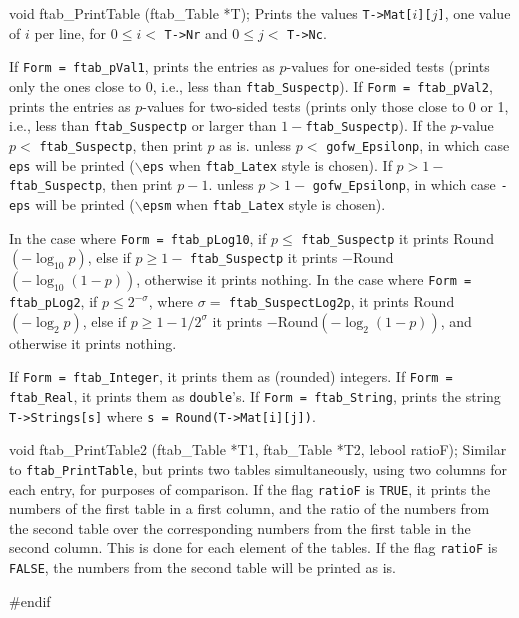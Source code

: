 void ftab_PrintTable (ftab_Table *T);
\endcode
 \tab
  Prints the values {\tt T->Mat[$i$][$j$]}, one value of $i$ per line,
  for $0 \le i < ${ \tt T->Nr} and $0 \le j < ${ \tt T->Nc}.

  If {\tt Form = ftab\_pVal1}, prints the entries as $p$-values for
  one-sided tests (prints only the ones close to 0, i.e., less than
  {\tt ftab\_Suspectp}).
  If {\tt Form = ftab\_pVal2}, prints the entries as $p$-values for
  two-sided tests (prints only those close to 0 or 1, i.e.,
  less than {\tt ftab\_Suspectp} or larger than $1 - {}${\tt ftab\_Suspectp}).
  If the $p$-value $p <$ {\tt ftab\_Suspectp}, then print $p$ as is.
  unless $p <$ {\tt gofw\_Epsilonp}, in which case {\tt eps} will be printed
   ({\tt $\backslash$eps} when {\tt ftab\_Latex} style is chosen).
  If $p > 1 - {}${\tt ftab\_Suspectp}, then print $p-1$.
  unless $p > 1 - {}$ {\tt gofw\_Epsilonp}, in which case {\tt -eps} will be
   printed ({\tt $\backslash$epsm} when {\tt ftab\_Latex} style is chosen).

  In the case where {\tt Form = ftab\_pLog10}, 
  if $p \le $ {\tt ftab\_Suspectp} it prints  Round$(- \log_{10} p)$,
  else if $p \ge 1 - $ {\tt ftab\_Suspectp} it prints 
  $-$Round$(- \log_{10} (1-p))$, otherwise it prints nothing.
  In the case where {\tt Form = ftab\_pLog2}, 
  if $p \le 2^{-\sigma}$, where $\sigma =$ {\tt ftab\_SuspectLog2p},
  it prints {\rm Round$( - \log_2 p)$}, else if $p \ge 1 - 1/2^\sigma$
  it prints $-${\rm  Round$(- \log_2 (1-p))$}, and otherwise it prints
  nothing. 

  If {\tt Form = ftab\_Integer}, it prints them as (rounded) integers.
  If {\tt Form = ftab\_Real}, it prints them as {\tt double}'s.
  If {\tt Form = ftab\_String},  prints  the string 
  {\tt  T->Strings[s]} where {\tt s = {\rm Round}(T->Mat[i][j])}.

 \endtab
\code


void ftab_PrintTable2 (ftab_Table *T1, ftab_Table *T2, lebool ratioF);
\endcode
 \tab
  Similar to {\tt ftab\_PrintTable}, but prints two tables simultaneously,
  using two columns for each entry, for purposes of comparison. 
  If the flag {\tt ratioF} is {\tt TRUE}, it prints the numbers of the
  first table in a first column, and the ratio of the numbers from the
  second table over the corresponding numbers from the first table in the
  second column. This is done for each element of the tables.  
  If the flag {\tt ratioF} is {\tt FALSE}, the numbers from the second
  table will be printed as is. 
 \endtab
\code

\hide
#endif
\endhide
\endcode
